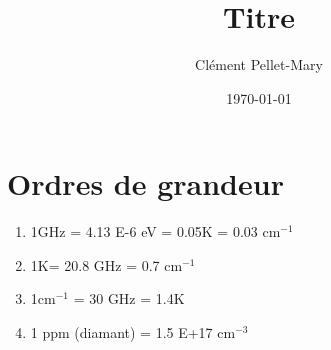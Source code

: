 \documentclass[a4paper]{article}
\title{Titre}
\author{Clément Pellet-Mary}
\date\today
\begin{document}
  \section{Ordres de grandeur}
  \begin{enumerate}
  \item 1GHz = 4.13 E-6 eV = 0.05K = 0.03 cm$^{-1}$
  \item 1K= 20.8 GHz = 0.7 cm$^{-1}$
  \item 1cm$^{-1}$ = 30 GHz = 1.4K
  \item 1 ppm (diamant) = 1.5 E+17 cm$^{-3}$
  \end{enumerate}

 
  
\end{document}
